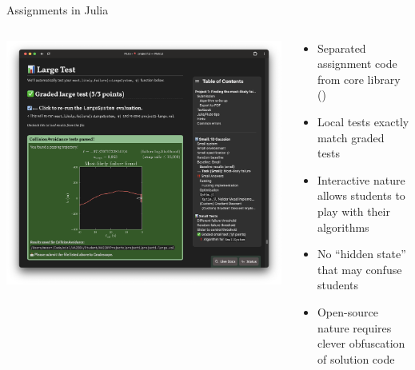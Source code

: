 \begin{frame}[fragile]{Assignments in Julia}

\begin{columns}
  \hfill
  \begin{column}{0.45\textwidth}
    \centering
    \includegraphics[width=\linewidth]{media/project1.png}

  \end{column}
  \pause
  \begin{column}{0.54\textwidth}
    \begin{itemize}
      \item Separated assignment code from core library () \pause
      \item Local tests exactly match graded tests \pause
      \item Interactive nature allows students to play with their algorithms \pause
      \item No ``hidden state'' that may confuse students \pause
      \item Open-source nature requires clever obfuscation of solution code
    \end{itemize}
  \end{column}
  \hfill
\end{columns}

\end{frame}